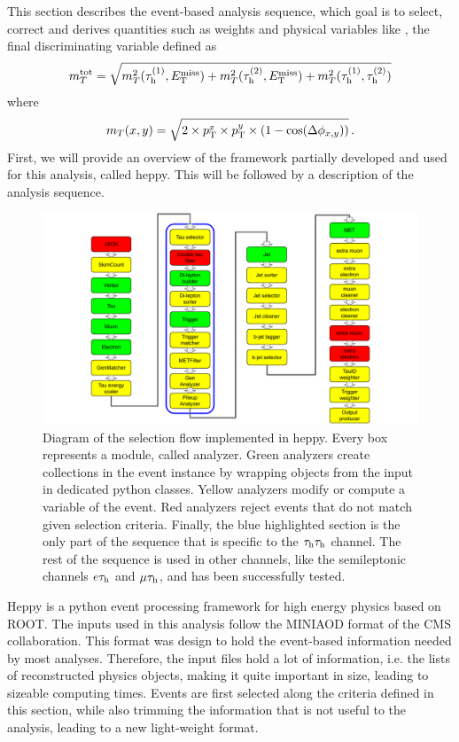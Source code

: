 This section describes the event-based analysis sequence, which goal is to select, correct and derives quantities such as weights and physical variables like \mttot, the final discriminating variable defined as 
\begin{equation}
    m_{T}^{\mathrm{tot}} = \sqrt{m_{T}^2(\tau_{\rm h}^{(1)},E_{\mathrm{T}}^{\text{miss}}) + m_{T}^2(\tau_{\rm h}^{(2)},E_{\mathrm{T}}^{\text{miss}}) + m_{T}^2(\tau_{\rm h}^{(1)},\tau_{\rm h}^{(2)})}
\end{equation}
where
\begin{equation}
    m_T (x,y) = \sqrt{2\times \pt^x \times \pt^y \times (1-\mathrm{cos}(\Delta \phi_{x,y}))} \mend
\end{equation}
First, we will provide an overview of the framework partially developed and used for this analysis, called heppy. This will be followed by a description of the analysis sequence.

\begin{figure}
    \centering
    \includegraphics[width=\textwidth]{Images/HEPPY_diagram.pdf}
    \caption{Diagram of the selection flow implemented in heppy. Every box represents a module, called analyzer. Green analyzers create collections in the event instance by wrapping objects from the input in dedicated python classes. Yellow analyzers modify or compute a variable of the event. Red analyzers reject events that do not match given selection criteria. Finally, the blue highlighted section is the only part of the sequence that is specific to the $\tau_{\rm h}\tau_{\rm h}$ channel. The rest of the sequence is used in other channels, like the semileptonic channels $e\tau_{\rm h}$ and $\mu\tau_{\rm h}$, and has been successfully tested.}
    \label{fig:HEPPY}
\end{figure}

Heppy is a python event processing framework for high energy physics based on ROOT. The inputs used in this analysis follow the MINIAOD format of the CMS collaboration. This format was design to hold the event-based information needed by most analyses. Therefore, the input files hold a lot of information, i.e. the lists of reconstructed physics objects, making it quite important in size, leading to sizeable computing times. Events are first selected along the criteria defined in this section, while also trimming the information that is not useful to the analysis, leading to a new light-weight format. 

